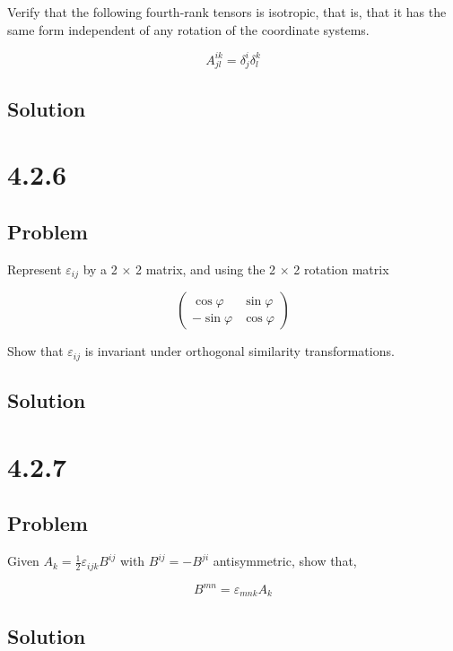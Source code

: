 \documentclass[12pt]{article}
\begin{document}
Verify that the following fourth-rank tensors is isotropic, that is, that it has the
same form independent of any rotation of the coordinate systems.

\[
    A^{ik}_{jl} = \delta^i_j \delta^k_l
\]

\subsection{Solution}

\newpage
\section{4.2.6}

\subsection{Problem}

Represent \(\varepsilon_{ij}\) by a 2 \(\times \) 2 matrix, and using the 2 \(\times \) 2 rotation matrix

\[
    \begin{pmatrix}
        \cos \varphi  & \sin \varphi \\
        -\sin \varphi & \cos \varphi
    \end{pmatrix}
\]

Show that \(\varepsilon_{ij}\) is invariant under orthogonal similarity transformations.

\subsection{Solution}

\newpage
\section{4.2.7}

\subsection{Problem}

Given \(A_k = \frac{1}{2}\varepsilon_{ijk}B^{ij}\) with \(B^{ij} = -B^{ji}\) antisymmetric, show that,

\[
    B^{mn} = \varepsilon_{mnk}A_k
\]

\subsection{Solution}
\end{document}
